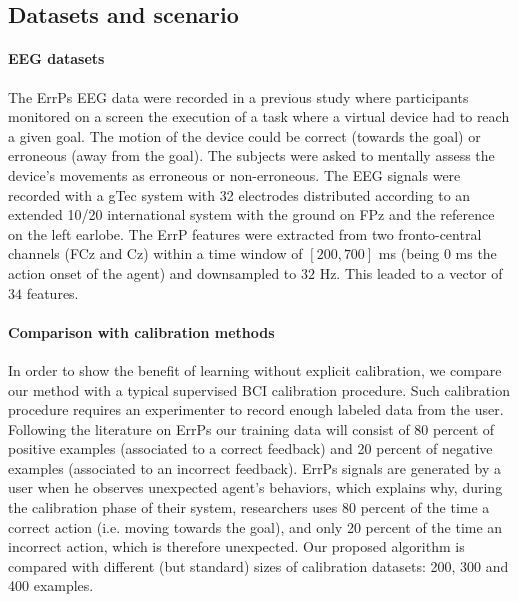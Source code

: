 \subsection{Datasets and scenario}

\paragraph{EEG datasets}  The ErrPs EEG data were recorded in a previous study \cite{iturrate2013task} where participants monitored on a screen the execution of a task where a virtual device had to reach a given goal. The motion of the device could be correct (towards the goal) or erroneous (away from the goal). The subjects were asked to mentally assess the device's movements as erroneous or non-erroneous. The EEG signals were recorded with a gTec system with 32 electrodes distributed according to an extended 10/20 international system with the ground on FPz and the reference on the left earlobe. The ErrP features were extracted from two fronto-central channels (FCz and Cz) within a time window of $[200,700]$ ms (being 0 ms the action onset of the agent) and downsampled to $32$ Hz. This leaded to a vector of $34$ features.


\paragraph{Comparison with calibration methods} In order to show the benefit of learning without explicit calibration, we compare our method with a typical supervised BCI calibration procedure. Such calibration procedure requires an experimenter to record enough labeled data from the user. Following the literature on ErrPs \cite{chavarriaga2010learning,iturrate2013task} our training data will consist of 80 percent of positive examples (associated to a correct feedback) and 20 percent of negative examples (associated to an incorrect feedback). ErrPs signals are generated by a user when he observes unexpected agent's behaviors, which explains why, during the calibration phase of their system, researchers uses 80 percent of the time a correct action (i.e. moving towards the goal), and only 20 percent of the time an incorrect action, which is therefore unexpected. Our proposed algorithm is compared with different (but standard) sizes of calibration datasets: 200, 300 and 400 examples.

